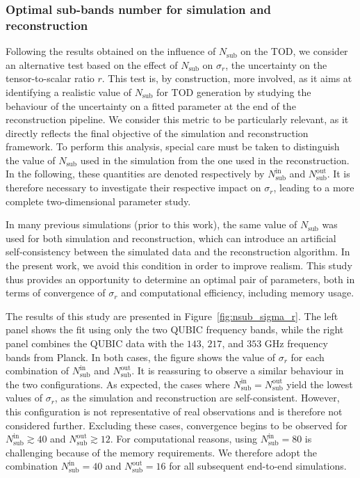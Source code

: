\documentclass[../../thesis.tex]{subfiles}
\begin{document}
\subsubsection{Optimal sub-bands number for simulation and reconstruction}

Following the results obtained on the influence of $N_{\text{sub}}$ on the TOD, we consider an alternative test based on the effect of $N_{\text{sub}}$ on $\sigma_r$, the uncertainty on the tensor-to-scalar ratio $r$.
This test is, by construction, more involved, as it aims at identifying a realistic value of $N_{\text{sub}}$ for TOD generation by studying the behaviour of the uncertainty on a fitted parameter at the end of the reconstruction pipeline. We consider this metric to be particularly relevant, as it directly reflects the final objective of the simulation and reconstruction framework.
To perform this analysis, special care must be taken to distinguish the value of $N_{\text{sub}}$ used in the simulation from the one used in the reconstruction. In the following, these quantities are denoted respectively by $N_{\text{sub}}^{\mathrm{in}}$ and $N_{\text{sub}}^{\mathrm{out}}$. It is therefore necessary to investigate their respective impact on $\sigma_r$, leading to a more complete two-dimensional parameter study.

In many previous simulations (prior to this work), the same value of $N_{\text{sub}}$ was used for both simulation and reconstruction, which can introduce an artificial self-consistency between the simulated data and the reconstruction algorithm. In the present work, we avoid this condition in order to improve realism.
This study thus provides an opportunity to determine an optimal pair of parameters, both in terms of convergence of $\sigma_r$ and computational efficiency, including memory usage.

The results of this study are presented in Figure~\ref{fig:nsub_sigma_r}. The left panel shows the fit using only the two QUBIC frequency bands, while the right panel combines the QUBIC data with the $143$, $217$, and $353$ GHz frequency bands from Planck. In both cases, the figure shows the value of $\sigma_r$ for each combination of $N_{\text{sub}}^{\mathrm{in}}$ and $N_{\text{sub}}^{\mathrm{out}}$. It is reassuring to observe a similar behaviour in the two configurations.
As expected, the cases where $N_{\text{sub}}^{\mathrm{in}} = N_{\text{sub}}^{\mathrm{out}}$ yield the lowest values of $\sigma_r$, as the simulation and reconstruction are self-consistent. However, this configuration is not representative of real observations and is therefore not considered further. Excluding these cases, convergence begins to be observed for $N_{\text{sub}}^{\mathrm{in}} \gtrsim 40$ and $N_{\text{sub}}^{\mathrm{out}} \gtrsim 12$. For computational reasons, using $N_{\text{sub}}^{\mathrm{in}} = 80$ is challenging because of the memory requirements. We therefore adopt the combination $N_{\text{sub}}^{\mathrm{in}} = 40$ and $N_{\text{sub}}^{\mathrm{out}} = 16$ for all subsequent end-to-end simulations.
\end{document}
